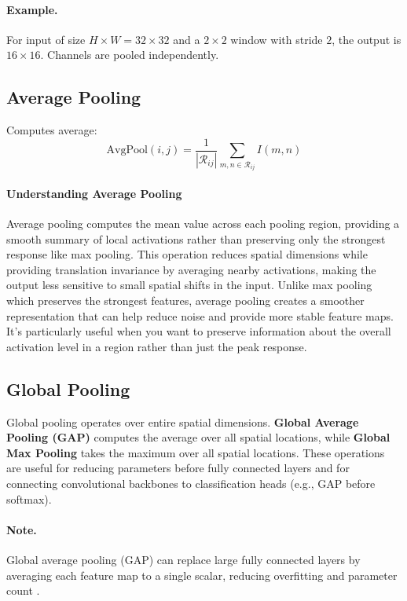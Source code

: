 \paragraph{Example.} For input of size $H\times W=32\times32$ and a $2\times2$ window with stride $2$, the output is $16\times16$. Channels are pooled independently.

\subsection{Average Pooling}

Computes average:
\begin{equation}
\text{AvgPool}(i,j) = \frac{1}{|\mathcal{R}_{ij}|} \sum_{m,n \in \mathcal{R}_{ij}} I(m,n)
\end{equation}

\paragraph{Understanding Average Pooling}
Average pooling computes the mean value across each pooling region, providing a smooth summary of local activations rather than preserving only the strongest response like max pooling. This operation reduces spatial dimensions while providing translation invariance by averaging nearby activations, making the output less sensitive to small spatial shifts in the input. Unlike max pooling which preserves the strongest features, average pooling creates a smoother representation that can help reduce noise and provide more stable feature maps. It's particularly useful when you want to preserve information about the overall activation level in a region rather than just the peak response.

\subsection{Global Pooling}

Global pooling operates over entire spatial dimensions. \textbf{Global Average Pooling (GAP)} computes the average over all spatial locations, while \textbf{Global Max Pooling} takes the maximum over all spatial locations. These operations are useful for reducing parameters before fully connected layers and for connecting convolutional backbones to classification heads (e.g., GAP before softmax).

\paragraph{Note.} Global average pooling (GAP) can replace large fully connected layers by averaging each feature map to a single scalar, reducing overfitting and parameter count \cite{GoodfellowEtAl2016}.

